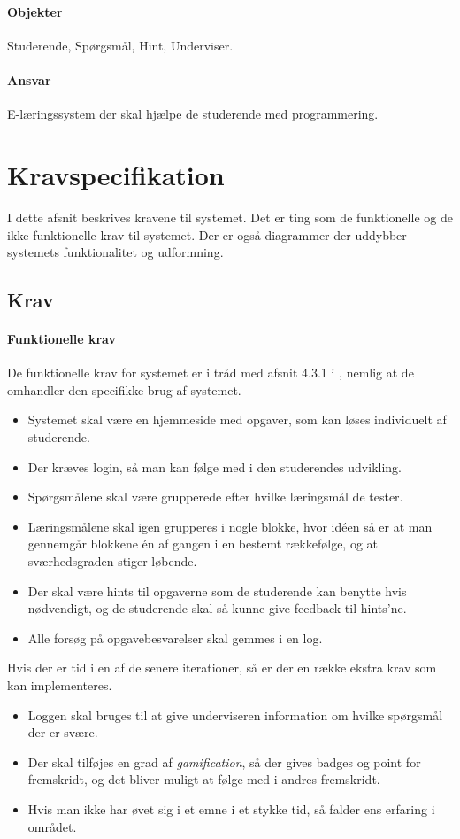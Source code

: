 \documentclass[11pt, a4paper]{article}
\begin{document}
\paragraph{Objekter}
Studerende, Spørgsmål, Hint, Underviser.
\paragraph{Ansvar}
E-læringssystem der skal hjælpe de studerende med programmering.

\section{Kravspecifikation}
\label{sec:kravspecifikation}
I dette afsnit beskrives kravene til systemet. Det er ting som de funktionelle og de ikke-funktionelle krav til systemet. Der er også diagrammer der uddybber systemets funktionalitet og udformning.
\subsection{Krav}
\label{sub:krav}
\paragraph{Funktionelle krav}
De funktionelle krav for systemet er i tråd med afsnit 4.3.1 i \cite{OOSE}, nemlig at de omhandler den specifikke brug af systemet.
\begin{itemize}
    \item Systemet skal være en hjemmeside med opgaver, som kan løses individuelt af studerende.
    \item Der kræves login, så man kan følge med i den studerendes udvikling.
    \item Spørgsmålene skal være grupperede efter hvilke læringsmål de tester.
    \item Læringsmålene skal igen grupperes i nogle blokke, hvor idéen så er at man gennemgår blokkene én af gangen i en bestemt rækkefølge, og at sværhedsgraden stiger løbende.
    \item Der skal være hints til opgaverne som de studerende kan benytte hvis nødvendigt, og de studerende skal så kunne give feedback til hints'ne.
    \item Alle forsøg på opgavebesvarelser skal gemmes i en log.
\end{itemize}
Hvis der er tid i en af de senere iterationer, så er der en række ekstra krav som kan implementeres.
\begin{itemize}
    \item Loggen skal bruges til at give underviseren information om hvilke spørgsmål der er svære.
    \item Der skal tilføjes en grad af \emph{gamification}, så der gives badges og point for fremskridt, og det bliver muligt at følge med i andres fremskridt.
    \item Hvis man ikke har øvet sig i et emne i et stykke tid, så falder ens erfaring i området.
\end{itemize}
\end{document}
